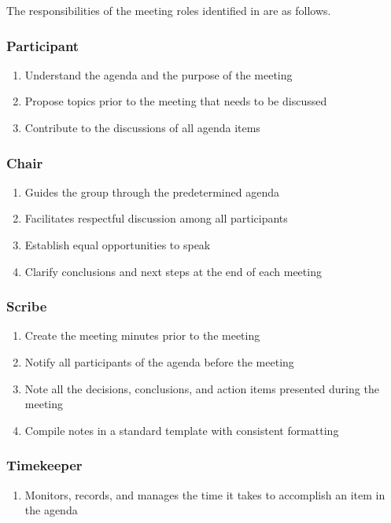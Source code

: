 \documentclass[12pt,letterpaper]{article}
\begin{document}
The responsibilities of the meeting roles identified in
 are as follows.
\subsubsection{Participant}
\begin{enumerate}
    \item Understand the agenda and the purpose of the meeting 
    \item Propose topics prior to the meeting that needs to be discussed
    \item Contribute to the discussions of all agenda items
\end{enumerate}
\subsubsection{Chair}
\begin{enumerate}
    \item Guides the group through the predetermined agenda
    \item Facilitates respectful discussion among all participants
    \item Establish equal opportunities to speak
    \item Clarify conclusions and next steps at the end of each meeting
\end{enumerate}
\subsubsection{Scribe}
\label{scribe}
\begin{enumerate}
    \item Create the meeting minutes prior to the meeting
    \item Notify all participants of the agenda before the meeting
    \item Note all the decisions, conclusions, and action items presented during
    the meeting
    \item Compile notes in a standard template with consistent formatting
\end{enumerate}
\subsubsection{Timekeeper}
\begin{enumerate}
    \item Monitors, records, and manages the time it takes to accomplish an item
    in the agenda
\end{enumerate}
\end{document}
